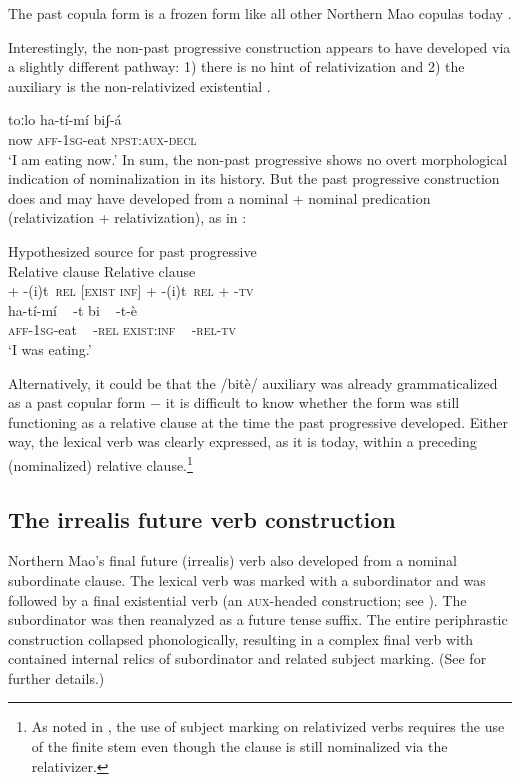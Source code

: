 \documentclass[output=paper]{langsci/langscibook}
\begin{document}
The past copula form is a frozen form like all other Northern Mao copulas today \citep[465]{Ahland2012}.

Interestingly, the non-past progressive construction appears to have developed via a slightly different pathway: 1) there is no hint of relativization and 2) the auxiliary is the non-relativized existential . 

\ea\label{ex:mahland:71}
\gll toːlo   ha-tí-mí         biʃ-á   \\
now   \textsc{aff-1sg}{}-eat    \textsc{npst:aux-decl} \\
\glt `I am eating now.'
\z
In sum, the non-past progressive shows no overt morphological indication of nominalization in its history. But the past progressive construction does and may have developed from a nominal + nominal predication (relativization + relativization), as in : 

\ea\label{ex:mahland:72}
Hypothesized source for past progressive\\
Relative clause      Relative clause \\{}
 + -(i)t~\textsc{rel}   [\textsc{exist inf}] + -(i)t~\textsc{rel}  + -\textsc{tv}      \\
         ha-tí-mí                  ~  {}-t                    bi ~ -t-è\\
\textsc{aff}-\textsc{1sg}-eat      ~  {}-\textsc{rel}     \textsc{exist:inf} ~ \textsc{-rel-tv}\\
\glt `I was eating.'
\z

Alternatively, it could be that the /bitè/ auxiliary was already grammaticalized as a past copular form $-$ it is difficult to know whether the form was still functioning as a relative clause at the time the past progressive developed. Either way, the lexical verb was clearly expressed, as it is today, within a preceding (nominalized) relative clause.\footnote{As noted in , the use of subject marking on relativized verbs requires the use of the finite stem even though the clause is still nominalized via the relativizer.}

\subsection{The irrealis future verb construction}\label{sec:mahland:3.3}

Northern Mao's final future (irrealis) verb also developed from a nominal subordinate clause. The lexical verb was marked with a subordinator and was followed by a final existential verb (an \textsc{aux}{}-headed construction; see \citealt[39ff]{Anderson2006}). The subordinator was then reanalyzed as a future tense suffix. The entire periphrastic construction collapsed phonologically, resulting in a complex final verb with contained internal relics of subordinator and related subject marking. (See \citealt{Ahland2014b} for further details.) 
\end{document}
